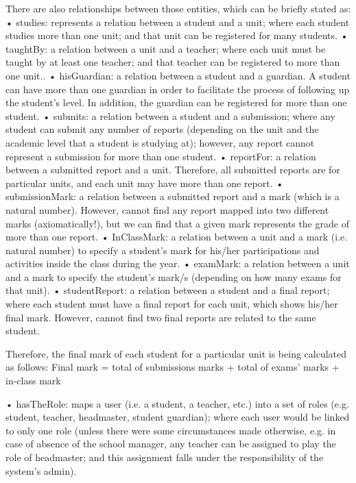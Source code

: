      There are also relationships between those entities, which can be briefly stated as:
•	studies:  represents a relation between a student and a unit; where each student studies more than one unit; and that unit can be registered for many students. 
•	taughtBy: a relation between a unit and a teacher; where each unit must be taught by at least one teacher; and that teacher can be registered to more than one unit..
•	hisGuardian: a relation between a student and a guardian.  A student can have more than one guardian in order to facilitate the process of following up the student’s level.  In addition, the guardian can be registered for more than one student.
•	submits:  a relation between a student and a submission; where any student can submit any number of reports (depending on the unit and the academic level that a student is studying at); however, any report cannot represent a submission for more than one student.
•	reportFor: a relation between a submitted report and a unit.  Therefore, all submitted reports are for particular units, and each unit may have more than one report. 
•	submissionMark: a relation between a submitted report and a mark (which is a natural number).  However, cannot find any report mapped into two different marks (axiomatically!), but we can find that a given mark represents the grade of more than one report.
•	InClassMark: a relation between a unit and a mark (i.e. natural number) to specify a student’s mark for his/her participations and activities inside the class during the year. 
•	examMark: a relation between a unit and a mark to specify the student’s mark/s (depending on how many exams for that unit). 
•	studentReport: a relation between a student and a final report; where each student must have a final report for each unit, which shows his/her final mark.  However, cannot find two final reports are related to the same student.

     Therefore, the final mark of each student for a particular unit is being calculated as follows:
Final mark = total of submissions marks + total of exams’ marks + in-class mark


•	hasTheRole: maps a user (i.e. a student, a teacher, etc.) into a set of roles (e.g. student, teacher, headmaster, student guardian); where each user would be linked to only one role (unless there were some circumstances made otherwise, e.g. in case of absence of the school manager, any teacher can be assigned to play the role of headmaster; and this assignment falls under the responsibility of the system’s admin).

